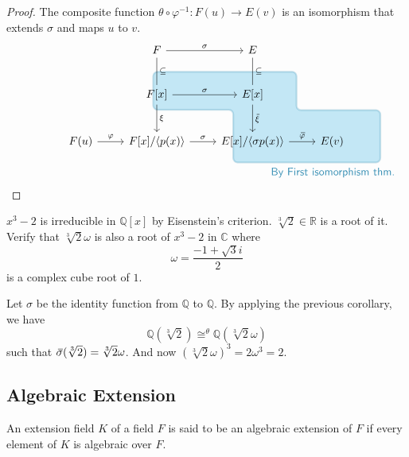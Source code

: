 \begin{proof}
    The composite function $\theta \circ \varphi^{-1} : F(u) \to E(v)$ is an isomorphism 
    that extends $\sigma$ and maps $u$ to $v$. 
    \[
        \tikz[overlay]{
      \draw (8.5,-2.25) node[anchor=south, color=cyan!70!black] {\textsf{By First isomorphism thm.}};
      \draw[ultra thick, cyan!70!black, fill=cyan!90!black, opacity=0.25, rounded corners] (5.35,-1.65) --
      (10,-1.65) --  (10,0.01) --  (7.35,0.01) --  (7.35,1.225) -- (2.82,1.225) -- (2.82,0.02) -- (5.35,0.02) -- cycle;
        }
        \begin{tikzcd}[row sep=2.5em]
            & F \arrow[r, "\sigma"] \arrow[dash, "\subseteq"]{d} & E \arrow[dash, "\subseteq"]{d} & \\
            & F[x] \arrow[r, "\sigma"] \arrow[d, "\xi"] & E[x] \arrow[d, "\olsi{\xi}"] & \\  
            F(u) \arrow[r, "\varphi"] & F[x] / \langle p(x) \rangle \arrow[r, "\sigma"] & E[x] / \langle \sigma p(x)\rangle \arrow[r, "\olsi{\varphi}"] & E(v)\\
        \end{tikzcd}
    \]
\end{proof}

\begin{example}
    $x^3 - 2$ is irreducible in $\mathbb{Q}[x]$ by Eisenstein's criterion. $\sqrt[3]{2} \in \mathbb{R}$ is a root of it.
    Verify that $\sqrt[3]{2} \omega$ is also a root of $x^3 - 2$ in $\mathbb{C}$ where 
    \[
        \omega = \frac{-1 + \sqrt{3}i}{2}
    \]
    is a complex cube root of $1$.
\end{example}
\begin{solution}
    Let $\sigma$ be the identity function from $\mathbb{Q}$ to $\mathbb{Q}$. By applying the previous corollary, we have
    \[
        \mathbb{Q}(\sqrt[3]{2}) \cong^\theta \mathbb{Q}(\sqrt[3]{2} \omega) 
    \]
    such that $\,\overline{\!{\sigma}}(\sqrt[3]{2}) = \sqrt[3]{2} \omega$. And now $(\sqrt[3]{2} \omega)^3 = 2 \omega^3 = 2$.
\end{solution}


\subsection{Algebraic Extension}

\begin{definition}
    An extension field $K$ of a field $F$ is said to be an algebraic extension of $F$ if every element 
    of $K$ is algebraic over $F$. 
\end{definition}

